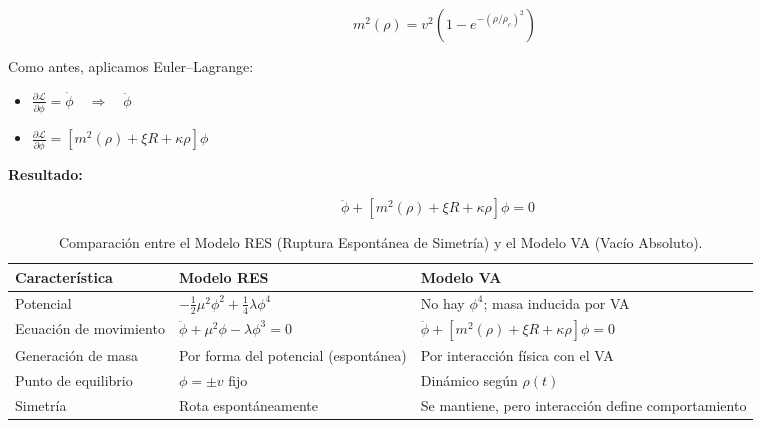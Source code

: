 \documentclass[twoside]{article}
\theoremstyle{definition}
\theoremstyle{remark}
\numberwithin{equation}{section}
\theoremstyle{definition}
\theoremstyle{example}
\theoremstyle{remark}
\numberwithin{equation}{section}%
\begin{document}
		\begin{equation}
			\quad m^2(\rho) = v^2 \left( 1 - e^{-(\rho/\rho_c)^2} \right)
		\end{equation}
		
		Como antes, aplicamos Euler–Lagrange:
		
		\begin{itemize}
			\item $\displaystyle \frac{\partial \mathcal{L}}{\partial \dot{\phi}} = \dot{\phi} \quad \Rightarrow \quad \ddot{\phi}$
			\item $\displaystyle \frac{\partial \mathcal{L}}{\partial \phi} = \left[ m^2(\rho) + \xi R + \kappa \rho \right] \phi$
		\end{itemize}
		
		
		
		\textbf{Resultado:}
		
		\begin{equation}
			\boxed{
				\ddot{\phi} + \left[ m^2(\rho) + \xi R + \kappa \rho \right] \phi = 0        }		
		\end{equation}
		
		
		
		
		
		\renewcommand{\arraystretch}{1.5} %
		\begin{table}[h]
			\centering
			\begin{tabular}{|>{\centering\arraybackslash}m{4.2cm}|m{5.5cm}|m{5.5cm}|}
				\hline
				\textbf{Característica} & \textbf{Modelo RES} & \textbf{Modelo VA} \\
				\hline
				Potencial & 
				$-\frac{1}{2}\mu^2 \phi^2 + \frac{1}{4} \lambda \phi^4$ & 
				No hay $\phi^4$; masa inducida por VA \\
				\hline
				Ecuación de movimiento & 
				$\ddot{\phi} + \mu^2 \phi - \lambda \phi^3 = 0$ & 
				$\ddot{\phi} + [m^2(\rho) + \xi R + \kappa \rho] \phi = 0$ \\
				\hline
				Generación de masa & 
				Por forma del potencial (espontánea) & 
				Por interacción física con el VA \\
				\hline
				Punto de equilibrio & 
				$\phi = \pm v$ fijo & 
				Dinámico según $\rho(t)$ \\
				\hline
				Simetría & 
				Rota espontáneamente & 
				Se mantiene, pero interacción define comportamiento \\
				\hline
			\end{tabular}
			\caption{Comparación entre el Modelo RES (Ruptura Espontánea de Simetría) y el Modelo VA (Vacío Absoluto).}
			\label{tab:modelos}
		\end{table}
		
\end{document}
